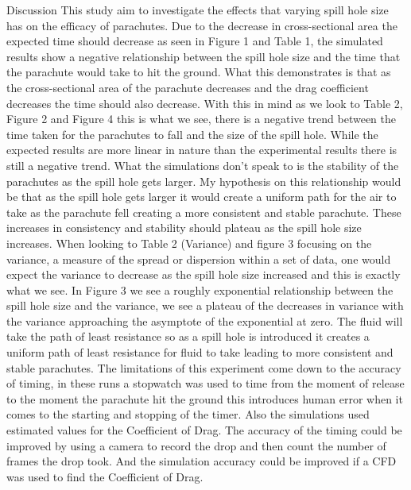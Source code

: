 \documentclass[final]{beamer}
\newlength{\colwidth}
\begin{document}
\begin{frame}[t]
\begin{columns}[t]
\begin{column}{\colwidth}
\begin{block}{Discussion}
This study aim to investigate the effects that varying spill hole size has on the efficacy of parachutes. Due to the decrease in cross-sectional area the expected time should decrease as seen in Figure 1 and Table 1, the simulated results show a negative relationship between the spill hole size and the time that the parachute would take to hit the ground. What this demonstrates is that as the cross-sectional area of the parachute decreases and the drag coefficient decreases the time should also decrease. With this in mind as we look to Table 2, Figure 2 and Figure 4 this is what we see, there is a negative trend between the time taken for the parachutes to fall and the size of the spill hole. While the expected results are more linear in nature than the experimental results there is still a negative trend. What the simulations don't speak to is the stability of the parachutes as the  spill hole gets larger. My hypothesis on this relationship would be that as the spill hole gets larger it would create a uniform path for the air to take as the parachute fell creating a more consistent and stable parachute. These increases in consistency and stability should plateau as the spill hole size increases. When looking to Table 2 (Variance) and figure 3 focusing on the variance, a measure of the spread or dispersion within a set of data, one would expect the variance to decrease as the spill hole size increased and this is exactly what we see. In Figure 3 we see a roughly exponential relationship between the spill hole size and the variance, we see a plateau of the decreases in variance with the variance approaching the asymptote of the exponential at zero. The fluid will take the path of least resistance so as a spill hole is introduced it creates a uniform path of least resistance for fluid to take leading to more consistent and stable parachutes. The limitations of this experiment come down to the accuracy of timing, in these runs a stopwatch was used to time from the moment of release to the moment the parachute hit the ground this introduces human error when it comes to the starting and stopping of the timer. Also the simulations used estimated values for the Coefficient of Drag. The accuracy of the timing could be improved by using a camera to record the drop and then count the number of frames the drop took. And the simulation accuracy could be  improved if a CFD was used to find the Coefficient of Drag.
 \end{block}


\end{column}
\end{columns}
\end{frame}
\end{document}
